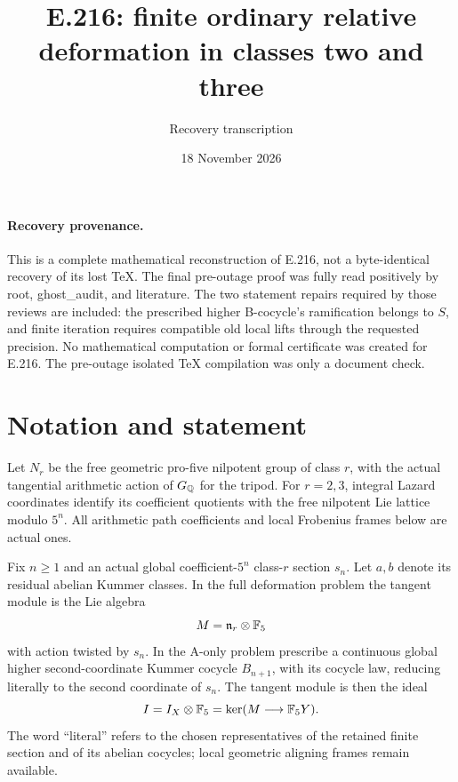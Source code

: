 \documentclass[11pt]{article}
\title{E.216: finite ordinary relative deformation in classes two and three}
\author{Recovery transcription}\date{18 November 2026}
\begin{document}
\maketitle
\paragraph{Recovery provenance.}
This is a complete mathematical reconstruction of E.216, not a byte-identical recovery of its lost TeX. The final pre-outage proof was fully read positively by root, ghost\_audit, and literature. The two statement repairs required by those reviews are included: the prescribed higher B-cocycle's ramification belongs to $S$, and finite iteration requires compatible old local lifts through the requested precision. No mathematical computation or formal certificate was created for E.216. The pre-outage isolated TeX compilation was only a document check.

\section*{Notation and statement}
Let $N_r$ be the free geometric pro-five nilpotent group of class $r$, with the actual tangential arithmetic action of $G_\mathbb Q$ for the tripod. For $r=2,3$, integral Lazard coordinates identify its coefficient quotients with the free nilpotent Lie lattice modulo $5^n$. All arithmetic path coefficients and local Frobenius frames below are actual ones.

Fix $n\ge1$ and an actual global coefficient-$5^n$ class-$r$ section $s_n$. Let $a,b$ denote its residual abelian Kummer classes. In the full deformation problem the tangent module is the Lie algebra
\[
 M=\mathfrak n_r\otimes\mathbb F_5
\]
with action twisted by $s_n$. In the A-only problem prescribe a continuous global higher second-coordinate Kummer cocycle $B_{n+1}$, with its cocycle law, reducing literally to the second coordinate of $s_n$. The tangent module is then the ideal
\[
 I=I_X\otimes\mathbb F_5=\ker(M\longrightarrow\mathbb F_5Y).
\]
The word ``literal'' refers to the chosen representatives of the retained finite section and of its abelian cocycles; local geometric aligning frames remain available.
\end{document}
